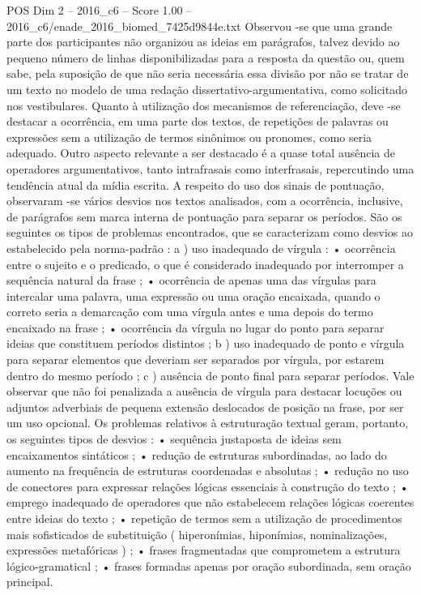 \begin{textsample}{POS Dim 2 – 2016\_c6 – Score 1.00 – 2016\_c6/enade\_2016\_biomed\_7425d9844e.txt}
Observou -se que uma grande parte dos participantes não organizou as ideias em parágrafos, talvez devido ao pequeno número de linhas disponibilizadas para a resposta da questão ou, quem sabe, pela suposição de que não seria necessária essa divisão por não se tratar de um texto no modelo de uma redação dissertativo-argumentativa, como solicitado nos vestibulares.
Quanto à utilização dos mecanismos de referenciação, deve -se destacar a ocorrência, em uma parte dos textos, de repetições de palavras ou expressões sem a utilização de termos sinônimos ou pronomes, como seria adequado.
Outro aspecto relevante a ser destacado é a quase total ausência de operadores argumentativos, tanto intrafrasais como interfrasais, repercutindo uma tendência atual da mídia escrita.
A respeito do uso dos sinais de pontuação, observaram -se vários desvios nos textos analisados, com a ocorrência, inclusive, de parágrafos sem marca interna de pontuação para separar os períodos.
São os seguintes os tipos de problemas encontrados, que se caracterizam como desvios ao estabelecido pela norma-padrão : a ) uso inadequado de vírgula : • ocorrência entre o sujeito e o predicado, o que é considerado inadequado por interromper a sequência natural da frase ; • ocorrência de apenas uma das vírgulas para intercalar uma palavra, uma expressão ou uma oração encaixada, quando o correto seria a demarcação com uma vírgula antes e uma depois do termo encaixado na frase ; • ocorrência da vírgula no lugar do ponto para separar ideias que constituem períodos distintos ; b ) uso inadequado de ponto e vírgula para separar elementos que deveriam ser separados por vírgula, por estarem dentro do mesmo período ; c ) ausência de ponto final para separar períodos.
Vale observar que não foi penalizada a ausência de vírgula para destacar locuções ou adjuntos adverbiais de pequena extensão deslocados de posição na frase, por ser um uso opcional.
Os problemas relativos à estruturação textual geram, portanto, os seguintes tipos de desvios : • sequência justaposta de ideias sem encaixamentos sintáticos ; • redução de estruturas subordinadas, ao lado do aumento na frequência de estruturas coordenadas e absolutas ; • redução no uso de conectores para expressar relações lógicas essenciais à construção do texto ; • emprego inadequado de operadores que não estabelecem relações lógicas coerentes entre ideias do texto ; • repetição de termos sem a utilização de procedimentos mais sofisticados de substituição ( hiperonímias, hiponímias, nominalizações, expressões metafóricas ) ; • frases fragmentadas que comprometem a estrutura lógico-gramatical ; • frases formadas apenas por oração subordinada, sem oração principal.

\end{textsample}
